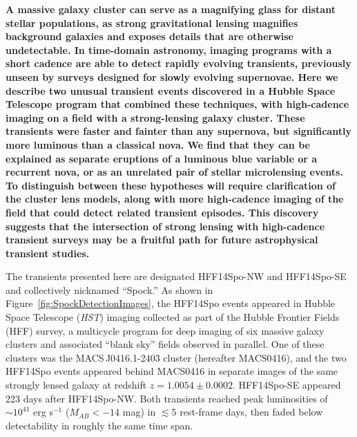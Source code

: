 \documentclass{article}
\def\HST{{\it HST}\xspace}
\def\spock{HFF14Spo\xspace}
\def\spockone{HFF14Spo-NW\xspace}
\def\spocktwo{HFF14Spo-SE\xspace}
\def\macs0416{MACS0416\xspace}
\def\fullmacs0416{MACS\,J0416.1-2403\xspace}
\begin{document}
\bigskip
{\bf
A massive galaxy cluster can serve as a magnifying glass for distant
stellar populations, as strong gravitational lensing magnifies
background galaxies and exposes details that are otherwise
undetectable.  In time-domain astronomy, imaging programs with a short
cadence are able to detect rapidly evolving transients, previously
unseen by surveys designed for slowly evolving supernovae.  Here we
describe two unusual transient events discovered in a Hubble Space
Telescope program that combined these techniques, with high-cadence
imaging on a field with a strong-lensing galaxy cluster.  These
transients were faster and fainter than any supernova, but
significantly more luminous than a classical nova.  We find that they
can be explained as separate eruptions of a luminous blue variable or
a recurrent nova, or as an unrelated pair of stellar microlensing
events. To distinguish between these hypotheses will require
clarification of the cluster lens models, along with more high-cadence
imaging of the field that could detect related transient episodes.
This discovery suggests that the intersection of strong lensing with
high-cadence transient surveys may be a fruitful path for future
astrophysical transient studies.
}



The transients presented here are designated \spockone and \spocktwo
and collectively nicknamed ``Spock.''  As shown in
Figure~\ref{fig:SpockDetectionImages}, the \spock events appeared in
Hubble Space Telescope (\HST) imaging collected as part of the Hubble
Frontier Fields (HFF) survey\cite{Lotz:2017}, a multicycle program for
deep imaging of six massive galaxy clusters and associated ``blank
sky'' fields observed in parallel.  One of these clusters was the
\fullmacs0416 cluster (hereafter \macs0416), and the two \spock events
appeared behind \macs0416 in separate images of the same strongly
lensed galaxy at redshift $z=1.0054\pm0.0002$. \spocktwo appeared 223
days after \spockone.  Both transients reached peak luminosities of
$\sim10^{41}$ erg s$^{-1}$ ($M_{AB}<-14$ mag) in $\lesssim5$
rest-frame days, then faded below detectability in roughly the same
time span.
\end{document}
